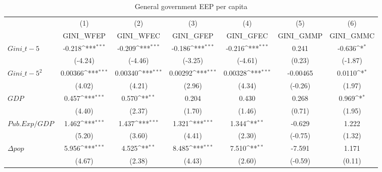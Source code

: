 \begin{table}[htbp]\centering
\def\sym#1{\ifmmode^{#1}\else\(^{#1}\)\fi}
\caption{General government EEP per capita}
\begin{tabular}{l*{6}{c}}
\hline\hline
                    &\multicolumn{1}{c}{(1)}         &\multicolumn{1}{c}{(2)}         &\multicolumn{1}{c}{(3)}         &\multicolumn{1}{c}{(4)}         &\multicolumn{1}{c}{(5)}         &\multicolumn{1}{c}{(6)}         \\
                    &   GINI\_WFEP         &   GINI\_WFEC         &   GINI\_GFEP         &   GINI\_GFEC         &   GINI\_GMMP         &   GINI\_GMMC         \\
\hline
$ Gini\_{t-5} $      &      -0.218\sym{***}&      -0.209\sym{***}&      -0.186\sym{***}&      -0.216\sym{***}&       0.241         &      -0.636\sym{*}  \\
                    &     (-4.24)         &     (-4.46)         &     (-3.25)         &     (-4.61)         &      (0.23)         &     (-1.87)         \\
[1em]
$ Gini\_{t-5}^2 $    &     0.00366\sym{***}&     0.00340\sym{***}&     0.00292\sym{***}&     0.00328\sym{***}&    -0.00465         &      0.0110\sym{*}  \\
                    &      (4.02)         &      (4.21)         &      (2.96)         &      (4.34)         &     (-0.26)         &      (1.97)         \\
[1em]
$ GDP $             &       0.457\sym{***}&       0.570\sym{**} &       0.204         &       0.430         &       0.268         &       0.969\sym{*}  \\
                    &      (4.40)         &      (2.37)         &      (1.70)         &      (1.46)         &      (0.71)         &      (1.95)         \\
[1em]
$ Pub.Exp/GDP $     &       1.462\sym{***}&       1.437\sym{***}&       1.321\sym{***}&       1.344\sym{**} &      -0.629         &       1.222         \\
                    &      (5.20)         &      (3.60)         &      (4.41)         &      (2.30)         &     (-0.75)         &      (1.32)         \\
[1em]
$ \Delta pop $      &       5.956\sym{***}&       4.525\sym{**} &       8.485\sym{***}&       7.510\sym{**} &      -7.591         &       1.171         \\
                    &      (4.67)         &      (2.38)         &      (4.43)         &      (2.60)         &     (-0.59)         &      (0.11)         \\

\end{tabular}
\end{table}
